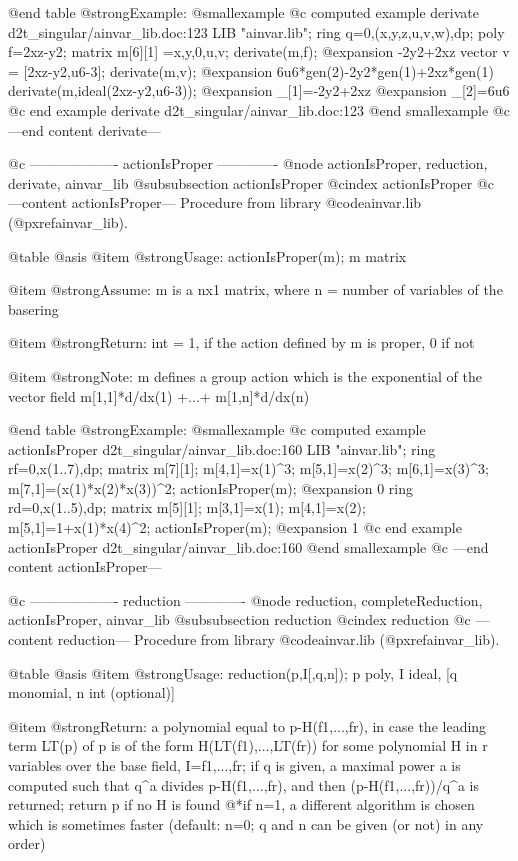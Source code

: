 @end table
@strong{Example:}
@smallexample
@c computed example derivate d2t_singular/ainvar_lib.doc:123 
LIB "ainvar.lib";
ring q=0,(x,y,z,u,v,w),dp;
poly f=2xz-y2;
matrix m[6][1] =x,y,0,u,v;
derivate(m,f);
@expansion{} -2y2+2xz
vector v = [2xz-y2,u6-3];
derivate(m,v);
@expansion{} 6u6*gen(2)-2y2*gen(1)+2xz*gen(1)
derivate(m,ideal(2xz-y2,u6-3));
@expansion{} _[1]=-2y2+2xz
@expansion{} _[2]=6u6
@c end example derivate d2t_singular/ainvar_lib.doc:123
@end smallexample
@c ---end content derivate---

@c ------------------- actionIsProper -------------
@node actionIsProper, reduction, derivate, ainvar_lib
@subsubsection actionIsProper
@cindex actionIsProper
@c ---content actionIsProper---
Procedure from library @code{ainvar.lib} (@pxref{ainvar_lib}).

@table @asis
@item @strong{Usage:}
actionIsProper(m); m matrix

@item @strong{Assume:}
m is a nx1 matrix, where n = number of variables of the basering

@item @strong{Return:}
int = 1, if the action defined by m is proper, 0 if not

@item @strong{Note:}
m defines a group action which is the exponential of the vector
field m[1,1]*d/dx(1) +...+ m[1,n]*d/dx(n)

@end table
@strong{Example:}
@smallexample
@c computed example actionIsProper d2t_singular/ainvar_lib.doc:160 
LIB "ainvar.lib";
ring rf=0,x(1..7),dp;
matrix m[7][1];
m[4,1]=x(1)^3;
m[5,1]=x(2)^3;
m[6,1]=x(3)^3;
m[7,1]=(x(1)*x(2)*x(3))^2;
actionIsProper(m);
@expansion{} 0
ring rd=0,x(1..5),dp;
matrix m[5][1];
m[3,1]=x(1);
m[4,1]=x(2);
m[5,1]=1+x(1)*x(4)^2;
actionIsProper(m);
@expansion{} 1
@c end example actionIsProper d2t_singular/ainvar_lib.doc:160
@end smallexample
@c ---end content actionIsProper---

@c ------------------- reduction -------------
@node reduction, completeReduction, actionIsProper, ainvar_lib
@subsubsection reduction
@cindex reduction
@c ---content reduction---
Procedure from library @code{ainvar.lib} (@pxref{ainvar_lib}).

@table @asis
@item @strong{Usage:}
reduction(p,I[,q,n]); p poly, I ideal, [q monomial, n int (optional)]

@item @strong{Return:}
a polynomial equal to p-H(f1,...,fr), in case the leading
term LT(p) of p is of the form H(LT(f1),...,LT(fr)) for some
polynomial H in r variables over the base field, I=f1,...,fr;
if q is given, a maximal power a is computed such that q^a divides
p-H(f1,...,fr), and then (p-H(f1,...,fr))/q^a is returned;
return p if no H is found
@*if n=1, a different algorithm is chosen which is sometimes faster
(default: n=0; q and n can be given (or not) in any order)


